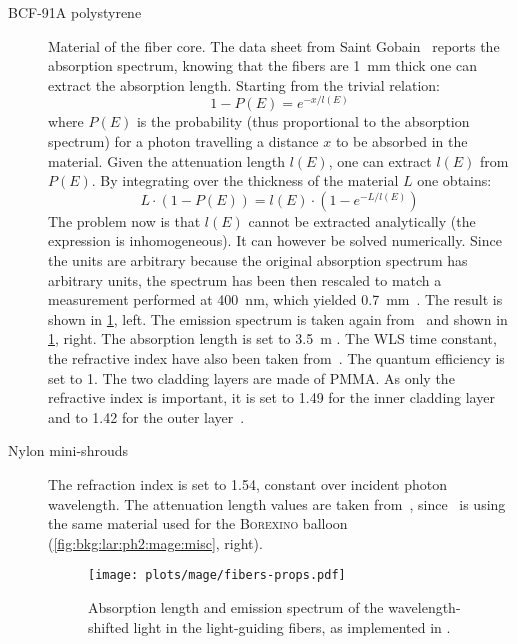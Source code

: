 \begin{description}

  \item[BCF-91A polystyrene] Material of the fiber core. The data sheet from Saint
    Gobain~\cite{FibersData} reports the absorption spectrum, knowing that the fibers are
    1~mm thick one can extract the absorption length. Starting from the trivial relation:
    \[
      1 - P(E) = e^{-x/l(E)}
    \]
    where $P(E)$ is the probability (thus proportional to the absorption
    spectrum) for a photon travelling a distance $x$ to be absorbed in the
    material. Given the attenuation length $l(E)$, one can extract $l(E)$ from
    $P(E)$. By integrating over the thickness of the material $L$ one obtains:
    \[
      L \cdot (1 - P(E)) = l(E) \cdot (1 - e^{-L/l(E)})
    \]
    The problem now is that $l(E)$ cannot be extracted analytically (the expression is
    inhomogeneous). It can however be solved numerically.  Since the units are arbitrary
    because the original absorption spectrum has arbitrary units, the spectrum has been
    then rescaled to match a measurement performed at 400~nm, which yielded
    0.7~mm~\cite{Kneissl2012}. The result is shown in
    \cref{fig:bkg:lar:ph2:mage:fibers-props}, left. The emission spectrum is taken again
    from~\cite{FibersData} and shown in \cref{fig:bkg:lar:ph2:mage:fibers-props}, right.
    The absorption length is set to 3.5~m . The WLS time constant, the
    refractive index have also been taken from~\cite{FibersData}. The quantum efficiency
    is set to 1. The two cladding layers are made of PMMA. As only the refractive index is
    important, it is set to 1.49 for the inner cladding layer and to 1.42 for the outer
    layer~\cite{FibersData}.

  \item[Nylon mini-shrouds] The refraction index is set to 1.54, constant over
    incident photon wavelength. The attenuation length values are taken
    from~\cite{Agostini2017b}, since \gerda\ is using the same material used for the
    \textsc{Borexino} balloon (\cref{fig:bkg:lar:ph2:mage:misc}, right).

    \begin{figure}
      \centering
      \texttt{[image: plots/mage/fibers-props.pdf]}
      \caption{%
        Absorption length and emission spectrum of the wavelength-shifted light in the
        light-guiding fibers, as implemented in \mage.
      }\label{fig:bkg:lar:ph2:mage:fibers-props}
    \end{figure}

\end{description}

